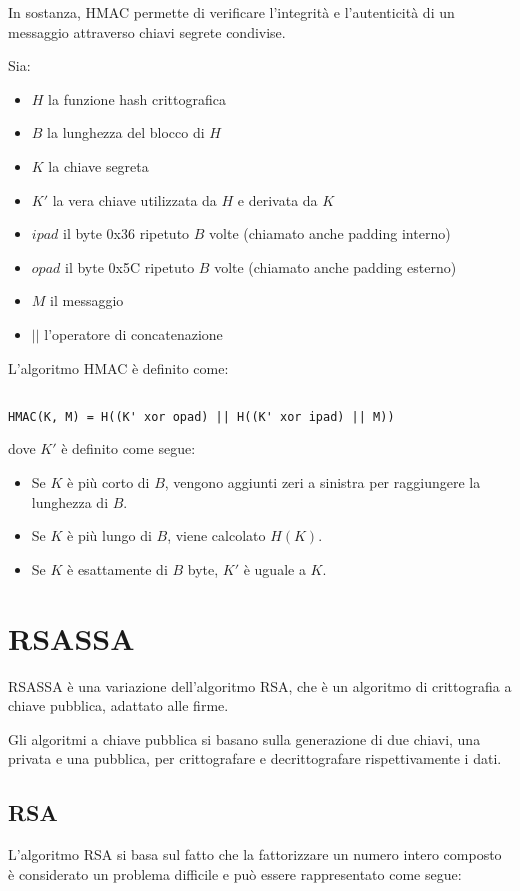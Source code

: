 \documentclass{article}
\begin{document}
In sostanza, HMAC permette di verificare l'integrità e l'autenticità di un messaggio attraverso chiavi segrete condivise.

Sia:
\begin{itemize}
	\item $H$ la funzione hash crittografica
	\item $B$ la lunghezza del blocco di $H$
	\item $K$ la chiave segreta
	\item $K'$ la vera chiave utilizzata da $H$ e derivata da $K$
	\item $ipad$ il byte 0x36 ripetuto $B$ volte (chiamato anche padding interno)
	\item $opad$ il byte 0x5C ripetuto $B$ volte (chiamato anche padding esterno)
	\item $M$ il messaggio
	\item $||$ l'operatore di concatenazione
\end{itemize}

L'algoritmo HMAC è definito come:
\begin{verbatim}

HMAC(K, M) = H((K' xor opad) || H((K' xor ipad) || M))

\end{verbatim}
dove $K'$ è definito come segue:
\begin{itemize}
	\item Se $K$ è più corto di $B$, vengono aggiunti zeri a sinistra per raggiungere la lunghezza di $B$.
	\item Se $K$ è più lungo di $B$, viene calcolato $H(K)$.
	\item Se $K$ è esattamente di $B$ byte, $K'$ è uguale a $K$.
\end{itemize}

\section{RSASSA}
RSASSA è una variazione dell'algoritmo RSA, che è un algoritmo di crittografia a chiave pubblica, adattato alle firme.

Gli algoritmi a chiave pubblica si basano sulla generazione di due chiavi, una privata e una pubblica, per crittografare e decrittografare rispettivamente i dati.

\subsection{RSA}
L'algoritmo RSA si basa sul fatto che la fattorizzare un numero intero composto è considerato un problema difficile e può essere rappresentato come segue:
\end{document}

